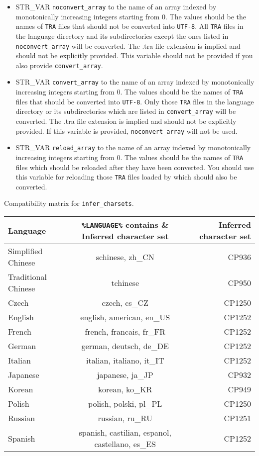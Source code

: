 \documentclass{article}
\def\ttref#1{\ahrefloc{#1}{\tt #1}}
\def\t#1{{\tt #1}}
\begin{document}
\begin{itemize}
\item STR_VAR \verb+noconvert_array+ to the name of an array indexed by monotonically increasing integers starting from 0. The values should be the names of \t{TRA} files that should not be converted into \t{UTF-8}. All \t{TRA} files in the language directory and its subdirectories except the ones listed in \verb+noconvert_array+ will be converted. The .tra file extension is implied and should not be explicitly provided. This variable should not be provided if you also provide \verb+convert_array+.
\item STR_VAR \verb+convert_array+ to the name of an array indexed by monotonically increasing integers starting from 0. The values should be the names of \t{TRA} files that should be converted into \t{UTF-8}. Only those \t{TRA} files in the language directory or its subdirectories which are listed in \verb+convert_array+ will be converted. The .tra file extension is implied and should not be explicitly provided. If this variable is provided, \verb+noconvert_array+ will not be used.
\item STR_VAR \verb+reload_array+ to the name of an array indexed by monotonically increasing integers starting from 0. The values should be the names of \t{TRA} files which should be reloaded after they have been converted. You should use this variable for reloading those \t{TRA} files loaded by \ttref{LANGUAGE} which should also be converted.
\end{itemize}

Compatibility matrix for \verb+infer_charsets+.
\begin{tabular} {l c r}
\hline
Language & \verb+%LANGUAGE%+ contains & Inferred character set \\
\hline
Simplified Chinese & schinese, zh_CN & CP936 \\
Traditional Chinese & tchinese & CP950 \\
Czech & czech, cs_CZ & CP1250 \\
English & english, american, en_US & CP1252 \\
French & french, francais, fr_FR & CP1252 \\
German & german, deutsch, de_DE & CP1252 \\
Italian & italian, italiano, it_IT & CP1252 \\
Japanese & japanese, ja_JP & CP932 \\
Korean & korean, ko_KR & CP949 \\
Polish & polish, polski, pl_PL & CP1250 \\
Russian & russian, ru_RU & CP1251 \\
Spanish & spanish, castilian, espanol, castellano, es_ES & CP1252 \\
\hline
\end{tabular}
\\
\end{document}
